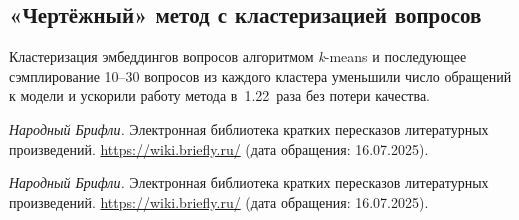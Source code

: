 \documentclass{article}
\theoremstyle{definition}
\theoremstyle{plain}
\begin{document}
\subsection*{«Чертёжный» метод с кластеризацией вопросов}
Кластеризация эмбеддингов вопросов алгоритмом \textit{k}-means и последующее сэмплирование 10--30 вопросов из каждого кластера уменьшили число обращений к модели и ускорили работу метода в~1.22 раза без потери качества.


\begin{thebibliography}{99}
\textit{Народный Брифли.}  
Электронная библиотека кратких пересказов литературных произведений.  
\url{https://wiki.briefly.ru/} (дата обращения: 16.07.2025).

\end{thebibliography}

\renewcommand\refname{References}


\begin{thebibliography}{99}
\textit{Народный Брифли.}  
Электронная библиотека кратких пересказов литературных произведений.  
\url{https://wiki.briefly.ru/} (дата обращения: 16.07.2025).

\end{thebibliography}
\end{document}
